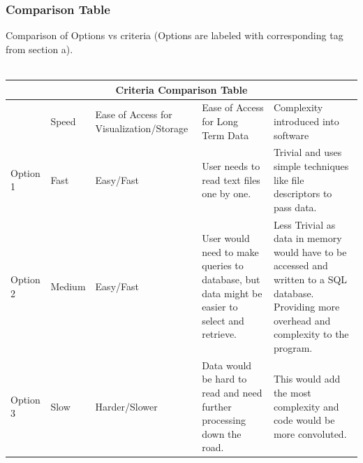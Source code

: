 \documentclass[10pt,draftclsnofoot,onecolumn,retainorgcmds]{IEEEtran}
\begin{document}
\subsubsection{Comparison Table}
Comparison of Options vs criteria (Options are labeled with corresponding tag from section a). \\ \\
\begin{table}
	\centering
\begin{tabular}{ |p{2cm}|p{2cm}|p{2cm}| p{2cm}|p{2cm}|  }
	\hline
	\multicolumn{5}{|c|}{Criteria Comparison Table} \\
	\hline
	&Speed&Ease of Access for Visualization/Storage&Ease of Access for Long Term Data&Complexity introduced into software\\
	\hline
	Option 1&Fast&Easy/Fast&User needs to read text files one by one.&Trivial and uses simple techniques like file descriptors to pass data. \\
	\hline
	Option 2&Medium&Easy/Fast&User would need to make queries to database, but data might be easier to select and retrieve.&Less Trivial as data in memory would have to be accessed and written to a SQL database. Providing more overhead and complexity to the program.\\
	\hline
	Option 3&Slow&Harder/Slower&Data would be hard to read and need further processing down the road.&This would add the most complexity and code would be more convoluted. \\
	\hline
\end{tabular}
\end{table}
\vspace{1cm}
\end{document}
